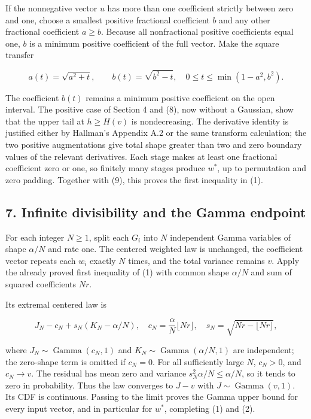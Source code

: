 \documentclass[10pt,a4paper]{article}
\begin{document}
If the nonnegative vector \(u\) has more than one coefficient strictly
between zero and one, choose a smallest positive fractional coefficient
\(b\) and any other fractional coefficient \(a\ge b\). Because all
nonfractional positive coefficients equal one, \(b\) is a minimum
positive coefficient of the full vector. Make the square transfer

\[
a(t)=\sqrt{a^2+t},\qquad b(t)=\sqrt{b^2-t},
\quad 0\le t\le\min(1-a^2,b^2).
\]

The coefficient \(b(t)\) remains a minimum positive coefficient on the
open interval. The positive case of Section 4 and (8), now without a
Gaussian, show that the upper tail at \(h\ge H(v)\) is nondecreasing.
The derivative identity is justified either by Hallman's Appendix A.2 or
the same transform calculation; the two positive augmentations give
total shape greater than two and zero boundary values of the relevant
derivatives. Each stage makes at least one fractional coefficient zero
or one, so finitely many stages produce \(w^*\), up to permutation and
zero padding. Together with (9), this proves the first inequality in
(1).

\subsection{7. Infinite divisibility and the Gamma
endpoint}\label{infinite-divisibility-and-the-gamma-endpoint}

For each integer \(N\ge1\), split each \(G_i\) into \(N\) independent
Gamma variables of shape \(\alpha/N\) and rate one. The centered
weighted law is unchanged, the coefficient vector repeats each \(w_i\)
exactly \(N\) times, and the total variance remains \(v\). Apply the
already proved first inequality of (1) with common shape \(\alpha/N\)
and sum of squared coefficients \(Nr\).

Its extremal centered law is

\[
J_N-c_N+s_N(K_N-\alpha/N),
\quad c_N=\frac\alpha N\lfloor Nr\rfloor,
\quad s_N=\sqrt{Nr-\lfloor Nr\rfloor},
\]

where \(J_N\sim\operatorname{Gamma}(c_N,1)\) and
\(K_N\sim\operatorname{Gamma}(\alpha/N,1)\) are independent; the
zero-shape term is omitted if \(c_N=0\). For all sufficiently large
\(N\), \(c_N>0\), and \(c_N\to v\). The residual has mean zero and
variance \(s_N^2\alpha/N\le\alpha/N\), so it tends to zero in
probability. Thus the law converges to \(J-v\) with
\(J\sim\operatorname{Gamma}(v,1)\). Its CDF is continuous. Passing to
the limit proves the Gamma upper bound for every input vector, and in
particular for \(w^*\), completing (1) and (2).
\end{document}
